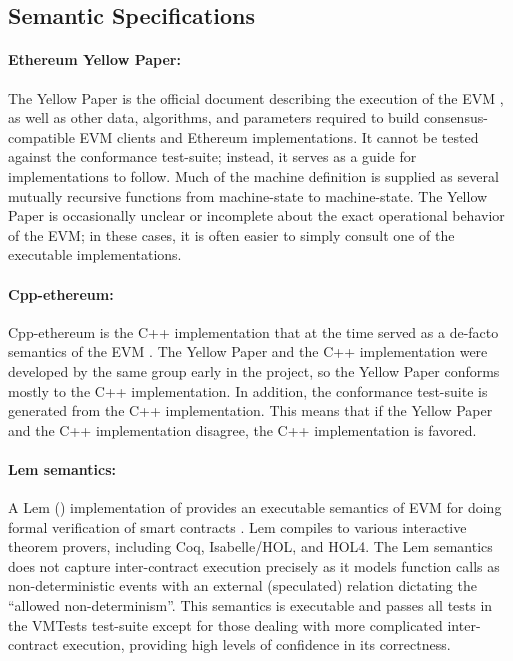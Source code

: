 \subsection{Semantic Specifications}

\paragraph{Ethereum Yellow Paper:}
The Yellow Paper is the official document describing the execution of the EVM
\cite{WoodReport14},
    as well as other data, algorithms,
    and parameters required to build consensus-compatible
    EVM clients and Ethereum implementations.
It cannot be tested against the conformance test-suite;
instead, it serves as a guide for implementations to follow.
Much of the machine definition is supplied as several mutually
recursive functions from machine-state to machine-state.
The Yellow Paper is occasionally unclear or incomplete about
the exact operational behavior of the EVM;
in these cases, it is often easier to simply consult one of the executable implementations.

\paragraph{Cpp-ethereum:}
Cpp-ethereum is the
C++ implementation that at the time served as a de-facto semantics of the EVM
\cite{CppEthereumUrl}.
The Yellow Paper and the C++ implementation were
developed by the same group early in the project,
          so the Yellow Paper conforms mostly to the C++ implementation.
In addition, the conformance test-suite is generated from the C++ implementation.
This means that if the Yellow Paper and the C++ implementation disagree,
     the C++ implementation is favored.

\paragraph{Lem semantics:}
A Lem (\cite{MulliganSIGPLAN14}) implementation of \EVM{} provides
an executable semantics of EVM for doing formal verification of smart contracts \cite{HiraiWSTC17}.
Lem compiles to various interactive theorem provers,
    including Coq, Isabelle/HOL, and HOL4.
The Lem semantics does not capture inter-contract
execution precisely as it models function calls as non-deterministic events with an external (speculated) relation dictating the ``allowed non-determinism''.
This semantics is executable and passes all tests in the VMTests
test-suite except for those dealing with more complicated inter-contract execution,
  providing high levels of confidence in its correctness.

